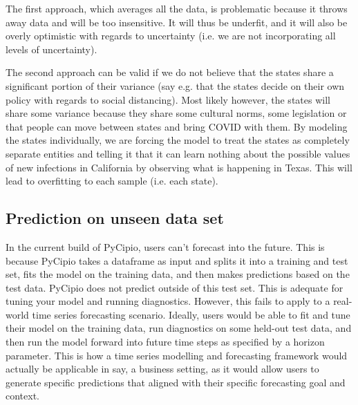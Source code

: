 \documentclass{article}
\begin{document}
The first approach, which averages all the data, is problematic because it throws away data and will be too insensitive. It will thus be underfit, and it will also be overly optimistic with regards to uncertainty (i.e. we are not incorporating all levels of uncertainty).

The second approach can be valid if we do not believe that the states share a significant portion of their variance (say e.g. that the states decide on their own policy with regards to social distancing). Most likely however, the states will share some variance because they share some cultural norms, some legislation or that people can move between states and bring COVID with them. By modeling the states individually, we are forcing the model to treat the states as completely separate entities and telling it that it can learn nothing about the possible values of new infections in California by observing what is happening in Texas. This will lead to overfitting to each sample (i.e. each state).


\subsection{Prediction on unseen data set}

In the current build of PyCipio, users can't forecast into the future. This is because PyCipio takes a dataframe as input and splits it into a training and test set, fits the model on the training data, and then makes predictions based on the test data. PyCipio does not predict outside of this test set. This is adequate for tuning your model and running diagnostics. However, this fails to apply to a real-world time series forecasting scenario. Ideally, users would be able to fit and tune their model on the training data, run diagnostics on some held-out test data, and then run the model forward into future time steps as specified by a horizon parameter. This is how a time series modelling and forecasting framework would actually be applicable in say, a business setting, as it would allow users to generate specific predictions that aligned with their specific forecasting goal and context.





\end{document}
